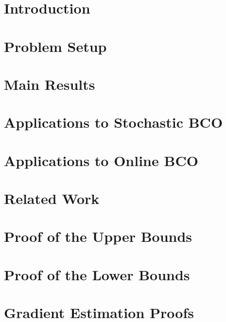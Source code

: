 \documentclass[twoside, 11pt]{article}
\begin{document}

\section{Introduction}
\label{sec:intro}


\section{Problem Setup}
\label{sec:problem}


\section{Main Results}
\label{sec:results}


\section{Applications to Stochastic BCO}
\label{sec:sbco}


\section{Applications to Online BCO}
\label{sec:obco}


\section{Related Work}
\label{sec:related}



%

\section{Proof of the Upper Bounds}
\label{sec:appendix-md}


\section{Proof of the Lower Bounds}
\label{sec:appendix-lb-proof}


\section{Gradient Estimation Proofs}
\label{sec:appendix-grad}

\end{document}
